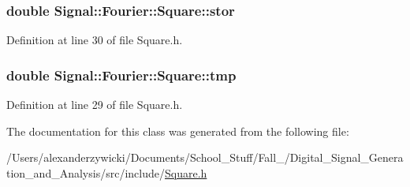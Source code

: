 \hypertarget{classSignal_1_1Fourier_1_1Square_a47ec083d36cef49c7d6583c8741b7905}{
\subsubsection[{stor}]{\setlength{\rightskip}{0pt plus 5cm}double Signal\+::\+Fourier\+::\+Square\+::stor\hspace{0.3cm}{\ttfamily [protected]}}}\label{classSignal_1_1Fourier_1_1Square_a47ec083d36cef49c7d6583c8741b7905}


Definition at line 30 of file Square.\+h.

\hypertarget{classSignal_1_1Fourier_1_1Square_a4fd9ac83ead8150ace9aadffb7c9e47f}{
\subsubsection[{tmp}]{\setlength{\rightskip}{0pt plus 5cm}double Signal\+::\+Fourier\+::\+Square\+::tmp\hspace{0.3cm}{\ttfamily [protected]}}}\label{classSignal_1_1Fourier_1_1Square_a4fd9ac83ead8150ace9aadffb7c9e47f}


Definition at line 29 of file Square.\+h.



The documentation for this class was generated from the following file\+:\begin{DoxyCompactItemize}
\item 
/\+Users/alexanderzywicki/\+Documents/\+School\+\_\+\+Stuff/\+Fall\+\_/\+Digital\+\_\+\+Signal\+\_\+\+Generation\+\_\+and\+\_\+\+Analysis/src/include/\hyperlink{Square_8h}{Square.\+h}\end{DoxyCompactItemize}
